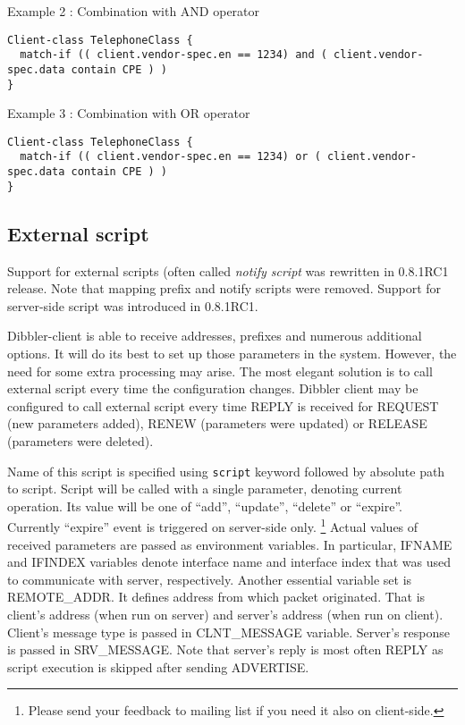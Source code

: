 \begin{enumerate}
Example 2 : Combination with AND operator
\begin{lstlisting}
Client-class TelephoneClass {
  match-if (( client.vendor-spec.en == 1234) and ( client.vendor-spec.data contain CPE ) )
}
\end{lstlisting}

Example 3 : Combination with OR operator
\begin{lstlisting}
Client-class TelephoneClass {
  match-if (( client.vendor-spec.en == 1234) or ( client.vendor-spec.data contain CPE ) )
}
\end{lstlisting}

\subsection{External script}
\label{feature-script}

\Note Support for external scripts (often called \emph{notify script}
  was rewritten in 0.8.1RC1 release. Note that mapping prefix and
notify scripts were removed. Support for server-side script was
introduced in 0.8.1RC1.

Dibbler-client is able to receive addresses, prefixes and numerous
additional options. It will do its best to set up those parameters in
the system. However, the need for some extra processing may arise. The
most elegant solution is to call external script every time the
configuration changes. Dibbler client may be configured to call
external script every time REPLY is received for REQUEST (new
parameters added), RENEW (parameters were updated) or RELEASE
(parameters were deleted).

Name of this script is specified using \verb+script+ keyword followed
by absolute path to script. Script will be called with a single
parameter, denoting current operation. Its value will be one of
``add'', ``update'', ``delete'' or ``expire''. Currently ``expire''
event is triggered on server-side only. \footnote{Please send your
feedback to mailing list if you need it also on client-side.} Actual
values of received parameters are passed as environment variables. In
particular, IFNAME and IFINDEX variables denote interface name and
interface index that was used to communicate with server,
respectively. Another essential variable set is REMOTE\_ADDR. It
defines address from which packet originated. That is client's address
(when run on server) and server's address (when run on
client). Client's message type is passed in CLNT\_MESSAGE
variable. Server's response is passed in SRV\_MESSAGE. Note that
server's reply is most often REPLY as script execution is skipped after
sending ADVERTISE.


\end{enumerate}
